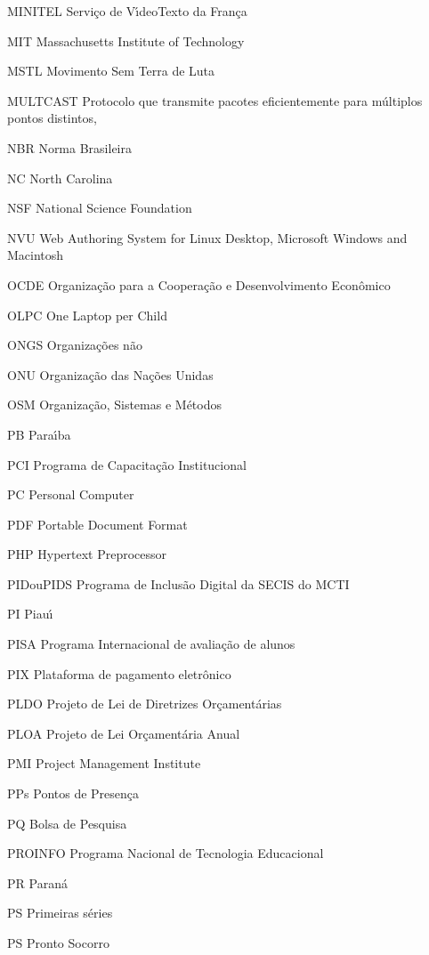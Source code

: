 \begin{siglas}
\item[MINITEL] Servi\c{c}o de V\'{\i}deoTexto da Fran\c{c}a
\item[MIT] Massachusetts Institute of Technology
\item[MSTL]  Movimento Sem Terra de Luta
\item[MULTCAST] Protocolo que transmite pacotes eficientemente para m\'ultiplos pontos distintos,
\item[NBR] Norma Brasileira
\item[NC] North Carolina
\item[NSF] National Science Foundation
\item[NVU] Web Authoring System for Linux Desktop, Microsoft Windows and Macintosh
\item[OCDE] Organiza\c{c}\~ao para a Coopera\c{c}\~ao e Desenvolvimento Econ\^omico
\item[OLPC] One Laptop per Child 
\item[ONGS] Organiza\c{c}\~oes n\~ao
\item[ONU] Organiza\c{c}\~ao das Na\c{c}\~oes Unidas
\item[OSM] Organiza\c{c}\~ao, Sistemas e M\'etodos
\item[PB] Para\'{\i}ba
\item[PCI] Programa de Capacita\c{c}\~ao Institucional
\item[PC] Personal Computer
\item[PDF] Portable Document Format
\item[PHP] Hypertext Preprocessor
\item[PIDouPIDS] Programa de Inclus\~ao Digital da SECIS do MCTI
\item[PI] Piau\'{\i}
\item[PISA] Programa Internacional de avalia\c{c}\~ao de alunos
\item[PIX] Plataforma de pagamento eletr\^onico
\item[PLDO] Projeto de Lei de Diretrizes Or\c{c}ament\'arias
\item[PLOA] Projeto de Lei Or\c{c}ament\'aria Anual
\item[PMI] Project Management Institute
\item[PPs] Pontos de Presen\c{c}a 
\item[PQ] Bolsa de Pesquisa
\item[PROINFO] Programa Nacional de Tecnologia Educacional
\item[PR] Paran\'a
\item[PS] Primeiras s\'eries
\item[PS] Pronto Socorro

\end{siglas}
